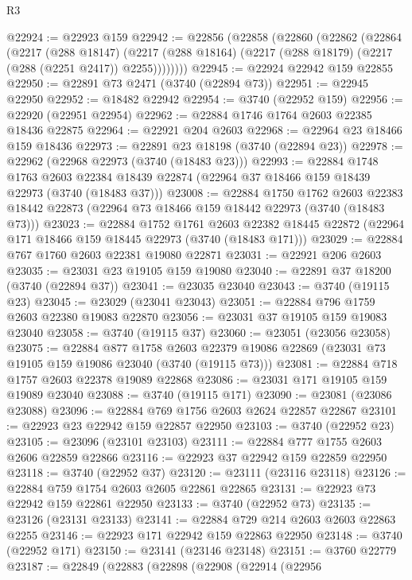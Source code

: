 \begin{lexlean}{R3}
\begin{coremodule}
@22924 := @22923 @159
@22942 := @22856
    (@22858
      (@22860
        (@22862
          (@22864
            (@2217
              (@288 @18147)
              (@2217 (@288 @18164) (@2217 (@288 @18179) (@2217 (@288 (@2251 @2417)) @2255))))))))
@22945 := @22924 @22942 @159 @22855
@22950 := @22891 @73 @2471 (@3740 (@22894 @73))
@22951 := @22945 @22950
@22952 := @18482 @22942
@22954 := @3740 (@22952 @159)
@22956 := @22920 (@22951 @22954)
@22962 := @22884 @1746 @1764 @2603 @22385 @18436 @22875
@22964 := @22921 @204 @2603
@22968 := @22964 @23 @18466 @159 @18436
@22973 := @22891 @23 @18198 (@3740 (@22894 @23))
@22978 := @22962 (@22968 @22973 (@3740 (@18483 @23)))
@22993 := @22884
    @1748
    @1763
    @2603
    @22384
    @18439
    @22874
    (@22964 @37 @18466 @159 @18439 @22973 (@3740 (@18483 @37)))
@23008 := @22884
    @1750
    @1762
    @2603
    @22383
    @18442
    @22873
    (@22964 @73 @18466 @159 @18442 @22973 (@3740 (@18483 @73)))
@23023 := @22884
    @1752
    @1761
    @2603
    @22382
    @18445
    @22872
    (@22964 @171 @18466 @159 @18445 @22973 (@3740 (@18483 @171)))
@23029 := @22884 @767 @1760 @2603 @22381 @19080 @22871
@23031 := @22921 @206 @2603
@23035 := @23031 @23 @19105 @159 @19080
@23040 := @22891 @37 @18200 (@3740 (@22894 @37))
@23041 := @23035 @23040
@23043 := @3740 (@19115 @23)
@23045 := @23029 (@23041 @23043)
@23051 := @22884 @796 @1759 @2603 @22380 @19083 @22870
@23056 := @23031 @37 @19105 @159 @19083 @23040
@23058 := @3740 (@19115 @37)
@23060 := @23051 (@23056 @23058)
@23075 := @22884
    @877
    @1758
    @2603
    @22379
    @19086
    @22869
    (@23031 @73 @19105 @159 @19086 @23040 (@3740 (@19115 @73)))
@23081 := @22884 @718 @1757 @2603 @22378 @19089 @22868
@23086 := @23031 @171 @19105 @159 @19089 @23040
@23088 := @3740 (@19115 @171)
@23090 := @23081 (@23086 @23088)
@23096 := @22884 @769 @1756 @2603 @2624 @22857 @22867
@23101 := @22923 @23 @22942 @159 @22857 @22950
@23103 := @3740 (@22952 @23)
@23105 := @23096 (@23101 @23103)
@23111 := @22884 @777 @1755 @2603 @2606 @22859 @22866
@23116 := @22923 @37 @22942 @159 @22859 @22950
@23118 := @3740 (@22952 @37)
@23120 := @23111 (@23116 @23118)
@23126 := @22884 @759 @1754 @2603 @2605 @22861 @22865
@23131 := @22923 @73 @22942 @159 @22861 @22950
@23133 := @3740 (@22952 @73)
@23135 := @23126 (@23131 @23133)
@23141 := @22884 @729 @214 @2603 @2603 @22863 @2255
@23146 := @22923 @171 @22942 @159 @22863 @22950
@23148 := @3740 (@22952 @171)
@23150 := @23141 (@23146 @23148)
@23151 := @3760 @22779
@23187 := @22849
    (@22883
      (@22898
        (@22908
          (@22914
            (@22956

\end{coremodule}
\end{lexlean}
